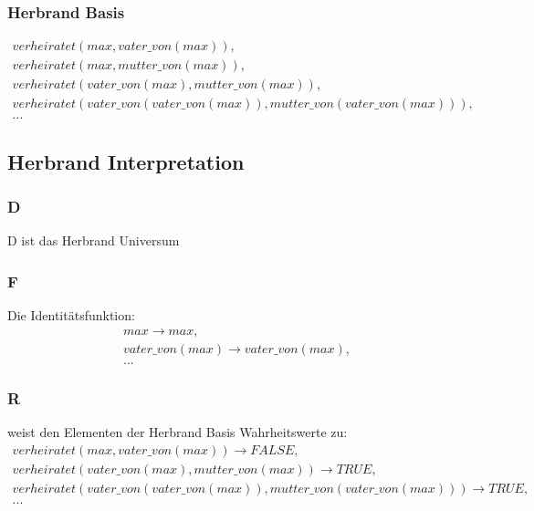 \documentclass[10pt,a4paper]{article}
\begin{document}
\subsubsection*{Herbrand Basis}
\begin{align*}
verheiratet(max, vater\_von(max)), \\
verheiratet(max, mutter\_von(max)), \\
verheiratet(vater\_von(max), mutter\_von(max)),\\
verheiratet(vater\_von(vater\_von(max)), mutter\_von(vater\_von(max))), \\
...
\end{align*}

\subsection*{Herbrand Interpretation}
\subsubsection*{D}
D ist das Herbrand Universum

\subsubsection*{F}
Die Identitätsfunktion:
\begin{align*}
max \rightarrow max, \\
vater\_von(max) \rightarrow vater\_von(max), \\
...
\end{align*}
\subsubsection*{R}
weist den Elementen der Herbrand Basis Wahrheitswerte zu:
\begin{align*}
verheiratet(max, vater\_von(max)) \rightarrow FALSE, \\
verheiratet(vater\_von(max), mutter\_von(max)) \rightarrow TRUE, \\
verheiratet(vater\_von(vater\_von(max)), mutter\_von(vater\_von(max))) \rightarrow TRUE, \\
...
\end{align*}
\end{document}
